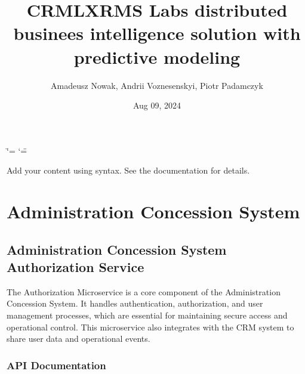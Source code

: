 \documentclass[letterpaper,10pt,english]{sphinxmanual}
\title{CRMLXRMS Labs \sphinxhyphen{}\sphinxhyphen{} distributed businees intelligence solution with predictive modeling}
\date{Aug 09, 2024}
\author{Amadeusz Nowak, Andrii Voznesenskyi, Piotr Padamczyk}
\begin{document}
\ifdefined\shorthandoff
  \ifnum\catcode`\=\string=\active\shorthandoff{=}\fi
  \ifnum\catcode`\"=\active{}\fi
\fi

\pagestyle{empty}
\sphinxmaketitle
\pagestyle{plain}
\sphinxtableofcontents
\pagestyle{normal}
\label{\detokenize{index::doc}}


\sphinxAtStartPar
Add your content using  syntax. See the
documentation for details.

\sphinxstepscope


\chapter{Administration Concession System}
\label{\detokenize{administration_concession_system/index:administration-concession-system}}\label{\detokenize{administration_concession_system/index::doc}}
\sphinxstepscope


\section{Administration Concession System Authorization Service}
\label{\detokenize{administration_concession_system/authorization_service:administration-concession-system-authorization-service}}\label{\detokenize{administration_concession_system/authorization_service::doc}}
\sphinxAtStartPar
The Authorization Microservice is a core component of the Administration Concession System. It handles authentication, authorization, and user management processes, which are essential for maintaining secure access and operational control. This microservice also integrates with the CRM system to share user data and operational events.



\subsection{API Documentation}
\label{\detokenize{administration_concession_system/authorization_service:api-documentation}}
\end{document}
